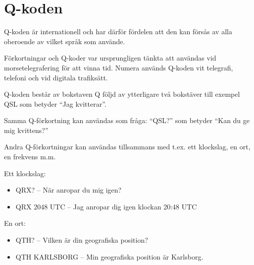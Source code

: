 \section{Q-koden}

Q-koden är internationell och har därför fördelen att den kan försås
av alla oberoende av vilket språk som använde.

Förkortningar och Q-koder var ursprungligen tänkta att användas vid
morsetelegrafering för att vinna tid. Numera används Q-koden vit
telegrafi, telefoni och vid digitala trafiksätt.

Q-koden består av bokstaven Q följd av ytterligare två bokstäver till
exempel QSL som betyder ``Jag kvitterar''.

Samma Q-förkortning kan användas som fråga: ``QSL?'' som betyder ``Kan
du ge mig kvittens?''

Andra Q-förkortningar kan användas tillsammans med t.ex. ett
klockslag, en ort, en frekvens m.m.

Ett klockslag:

\begin{itemize}
  \item QRX? -- När anropar du mig igen?
  \item QRX 2048 UTC -- Jag anropar dig igen klockan 20:48 UTC
\end{itemize}

En ort:

\begin{itemize}
\item QTH? -- Vilken är din geografiska position?
\item QTH KARLSBORG -- Min geografiska position är Karlsborg.
\end{itemize}

